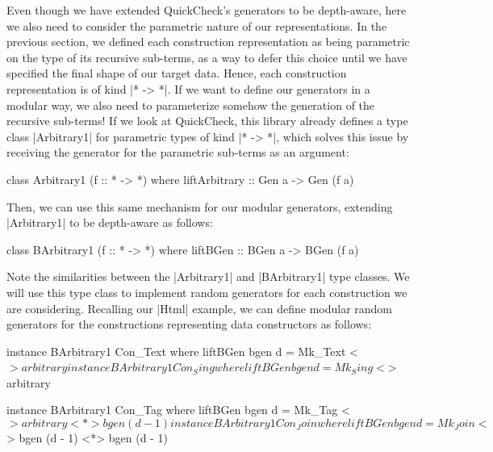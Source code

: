 Even though we have extended QuickCheck's generators to be depth-aware, here we
also need to consider the parametric nature of our representations.
%
In the previous section, we defined each construction representation as being
parametric on the type of its recursive sub-terms, as a way to defer this choice
until we have specified the final shape of our target data.
%
Hence, each construction representation is of kind |* -> *|.
%
If we want to define our generators in a modular way, we also need to
parameterize somehow the generation of the recursive sub-terms!
%
If we look at QuickCheck, this library already defines a type class |Arbitrary1|
for parametric types of kind |* -> *|, which solves this issue by receiving the
generator for the parametric sub-terms as an argument:

\begin{code}
class Arbitrary1 (f :: * -> *) where
  liftArbitrary :: Gen a -> Gen (f a)
\end{code}
%
%
%
%
Then, we can use this same mechanism for our modular generators, extending
|Arbitrary1| to be depth-aware as follows:

\begin{code}
class BArbitrary1 (f :: * -> *) where
  liftBGen :: BGen a -> BGen (f a)
\end{code}
%
Note the similarities between the |Arbitrary1| and |BArbitrary1| type classes.
%
We will use this type class to implement random generators for each construction
we are considering.
%
Recalling our |Html| example, we can define modular random generators for the
constructions representing data constructors as follows:

\begin{code}
instance BArbitrary1 Con_Text where
  liftBGen bgen d = Mk_Text <$> arbitrary

instance BArbitrary1 Con_Sing where
  liftBGen bgen d = Mk_Sing <$> arbitrary

instance BArbitrary1 Con_Tag where
  liftBGen bgen d = Mk_Tag <$> arbitrary <*> bgen (d - 1)

instance BArbitrary1 Con_Join where
  liftBGen bgen d = Mk_Join <$> bgen (d - 1) <*> bgen (d - 1)
\end{code} %

